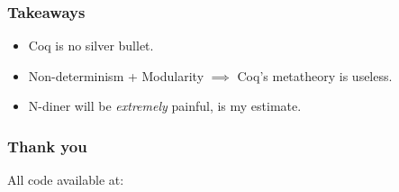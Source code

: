 \documentclass{beamer}
\begin{document}
\begin{frame}[fragile]
\frametitle{Takeaways}
\begin{itemize}
	\item Coq is no silver bullet. \pause
	\item Non-determinism + Modularity $\implies$ Coq's metatheory is useless. \pause
	\item N-diner will be \textit{extremely} painful, is my estimate.
\end{itemize}
\end{frame}

\begin{frame}[fragile]
\frametitle{Thank you}
    All code available at:

    {\tiny
    }

\end{frame}
\end{document}
